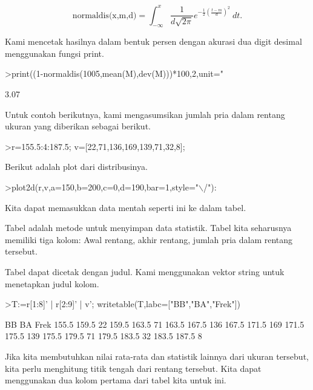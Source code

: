 \documentclass[a4paper,10pt]{article}
\begin{document}
\begin{eulernotebook}
\begin{eulercomment}
\end{eulercomment}
\begin{eulerformula}
\[
\text{normaldis(x,m,d)}=\int_{-\infty}^x \frac{1}{d\sqrt{2\pi}}e^{-\frac{1}{2}(\frac{t-m}{d})^2}\ dt.
\]
\end{eulerformula}
\begin{eulercomment}
Kami mencetak hasilnya dalam bentuk persen dengan akurasi dua digit
desimal menggunakan fungsi print.
\end{eulercomment}
\begin{eulerprompt}
>print((1-normaldis(1005,mean(M),dev(M)))*100,2,unit=" %
\end{eulerprompt}
\begin{euleroutput}
        3.07 %
\end{euleroutput}
\begin{eulercomment}
Untuk contoh berikutnya, kami mengasumsikan jumlah pria dalam rentang
ukuran yang diberikan sebagai berikut.
\end{eulercomment}
\begin{eulerprompt}
>r=155.5:4:187.5; v=[22,71,136,169,139,71,32,8];
\end{eulerprompt}
\begin{eulercomment}
Berikut adalah plot dari distribusinya.
\end{eulercomment}
\begin{eulerprompt}
>plot2d(r,v,a=150,b=200,c=0,d=190,bar=1,style="\(\backslash\)/"):
\end{eulerprompt}
\begin{eulercomment}
Kita dapat memasukkan data mentah seperti ini ke dalam tabel.

Tabel adalah metode untuk menyimpan data statistik. Tabel kita
seharusnya memiliki tiga kolom: Awal rentang, akhir rentang, jumlah
pria dalam rentang tersebut.

Tabel dapat dicetak dengan judul. Kami menggunakan vektor string untuk
menetapkan judul kolom.
\end{eulercomment}
\begin{eulerprompt}
>T:=r[1:8]' | r[2:9]' | v'; writetable(T,labc=["BB","BA","Frek"])
\end{eulerprompt}
\begin{euleroutput}
          BB        BA      Frek
       155.5     159.5        22
       159.5     163.5        71
       163.5     167.5       136
       167.5     171.5       169
       171.5     175.5       139
       175.5     179.5        71
       179.5     183.5        32
       183.5     187.5         8
\end{euleroutput}
\begin{eulercomment}
Jika kita membutuhkan nilai rata-rata dan statistik lainnya dari
ukuran tersebut, kita perlu menghitung titik tengah dari rentang
tersebut. Kita dapat menggunakan dua kolom pertama dari tabel kita
untuk ini.


\end{eulercomment}
\end{eulernotebook}
\end{document}
